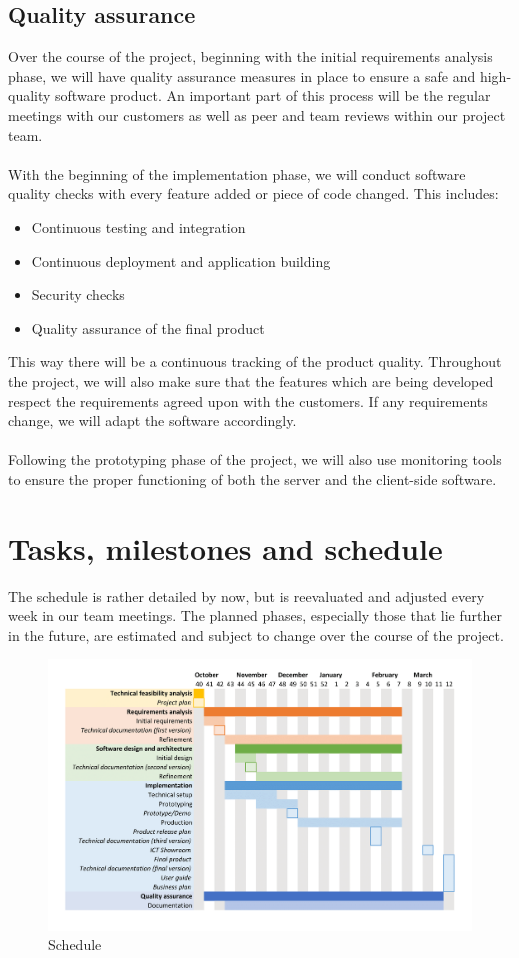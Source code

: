 \subsection{Quality assurance}\label{sec:quality}

Over the course of the project, beginning with the initial requirements analysis phase, we will have quality assurance measures in place to ensure a safe and high-quality software product. An important part of this process will be the regular meetings with our customers as well as peer and team reviews within our project team.
\\\\
With the beginning of the implementation phase, we will conduct software quality checks with every feature added or piece of code changed. This includes:

\begin{itemize}
	\item Continuous testing and integration
	\item Continuous deployment and application building
	\item Security checks
	\item Quality assurance of the final product
\end{itemize}

\noindent
This way there will be a continuous tracking of the product quality. Throughout the project, we will also make sure that the features which are being developed respect the requirements agreed upon with the customers. If any requirements change, we will adapt the software accordingly.
\\\\
Following the prototyping phase of the project, we will also use monitoring tools to ensure the proper functioning of both the server and the client-side software.

\section{Tasks, milestones and schedule}\label{sec:schedule}

The schedule is rather detailed by now, but is reevaluated and adjusted every week in our team meetings. The planned phases, especially those that lie further in the future, are estimated and subject to change over the course of the project.

\begin{figure}[ht]
	\centering
	\includegraphics[width=\linewidth]{images/schedule}
	\caption{Schedule}
	\label{fig:schedule}
\end{figure}
